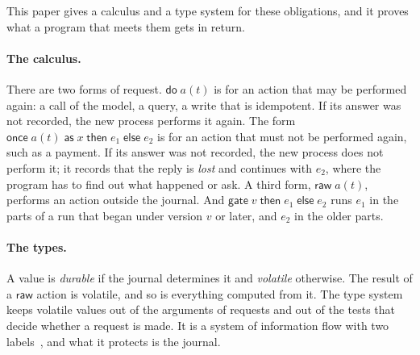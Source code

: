 \documentclass[acmsmall,nonacm,screen]{acmart}
\newcommand{\kw}[1]{\mathsf{#1}}
\newcommand{\nm}[1]{\mathit{#1}}
\newcommand{\doo}[2]{\kw{do}\;\nm{#1}(#2)}
\newcommand{\once}[5]{\kw{once}\;#1(#2)\;\kw{as}\;#3\;\kw{then}\;#4\;\kw{else}\;#5}
\newcommand{\raw}[2]{\kw{raw}\;\nm{#1}(#2)}
\newcommand{\gate}[3]{\kw{gate}\;#1\;\kw{then}\;#2\;\kw{else}\;#3}
\begin{document}
This paper gives a calculus and a type system for these obligations, and it proves what a
program that meets them gets in return.

\paragraph{The calculus.} There are two forms of request. $\doo{a}{t}$ is for an action
that may be performed again: a call of the model, a query, a write that is idempotent. If its
answer was not recorded, the new process performs it again. The form
$\once{a}{t}{x}{e_1}{e_2}$ is for an action that must not be performed again, such as a
payment. If its answer was not recorded, the new process does not perform it; it records that
the reply is \emph{lost} and continues with $e_2$, where the program has to find out what
happened or ask. A third form, $\raw{a}{t}$, performs an action outside the journal. And
$\gate{v}{e_1}{e_2}$ runs $e_1$ in the parts of a run that began under version $v$ or later,
and $e_2$ in the older parts.

\paragraph{The types.} A value is \emph{durable} if the journal determines it and
\emph{volatile} otherwise. The result of a $\kw{raw}$ action is volatile, and so is everything
computed from it. The type system keeps volatile values out of the arguments of requests and
out of the tests that decide whether a request is made. It is a system of information flow
with two labels~\citep{volpano1996}, and what it protects is the journal.
\end{document}
